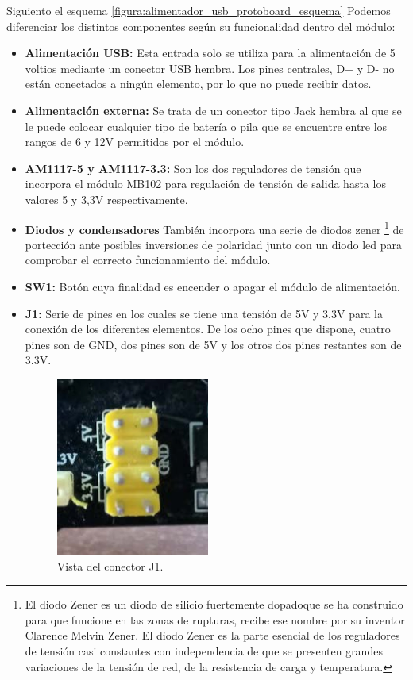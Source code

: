 Siguiento el esquema \ref{figura:alimentador_usb_protoboard_esquema} Podemos diferenciar los distintos componentes según su funcionalidad dentro del módulo:

\begin{itemize}
 \item \textbf{Alimentación USB:} Esta entrada solo se utiliza para la alimentación de 5 voltios mediante un conector USB hembra.
 Los pines centrales, D+ y D- no están conectados a ningún elemento, por lo que no puede recibir datos.

 \item \textbf{Alimentación externa:} Se trata de un conector tipo Jack hembra al que se le puede colocar cualquier tipo de batería
 o pila que se encuentre entre los rangos de 6 y 12V permitidos por el módulo.
 
 \item \textbf{AM1117-5 y AM1117-3.3:} Son los dos reguladores de tensión que incorpora el módulo MB102 para regulación de tensión de salida hasta los valores 
 5 y 3,3V respectivamente.
 
 \item \textbf{ Diodos y condensadores} También incorpora una serie de diodos zener \footnote{El diodo Zener es un diodo de silicio fuertemente dopado​ que se ha construido para que funcione en las zonas de rupturas, recibe ese nombre por su inventor Clarence Melvin Zener. El diodo Zener es la parte esencial de los reguladores de tensión casi constantes con independencia de que se presenten grandes variaciones de la tensión de red, de la resistencia de carga y temperatura. } 
 de portección ante posibles inversiones de polaridad junto con un diodo led para comprobar el correcto funcionamiento del módulo.
 
 \item \textbf{SW1:} Botón cuya finalidad es encender o apagar el módulo de alimentación.
 
 \item \textbf{J1:} Serie de pines en los cuales se tiene una tensión de 5V y 3.3V para la conexión de los diferentes elementos. De los ocho pines que dispone, cuatro pines son
 de GND, dos pines son de 5V y los otros dos pines restantes son de 3.3V.
 
 \begin{figure}[H]
  \begin{center}
    \includegraphics[scale=0.5]{imagenes/usb_board_pines.png}
  \end{center}
  \caption{Vista del conector J1.}
  \label{figura:conector_usb_board_j1}
\end{figure}


\end{itemize}
